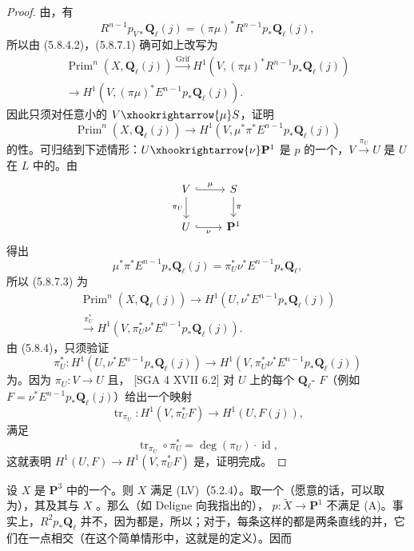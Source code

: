 \begin{proof}
由，有
\[R^{n-1}p_{V*}\mathbf Q_\ell(j)=(\pi\mu)^*R^{n-1}p_*\mathbf Q_\ell(j),\]
所以由 (5.8.4.2)，(5.8.7.1) 确可如上改写为
\[\begin{gathered}\operatorname{Prim}^n(X,\mathbf Q_\ell(j))\xrightarrow{\operatorname{Grif}}H^1(V,(\pi\mu)^*R^{n-1}p_*\mathbf Q_\ell(j))\\
\longrightarrow H^1(V,(\pi\mu)^*E^{n-1}p_*\mathbf Q_\ell(j)).\end{gathered}\]
因此只须对任意小的 $V\xhookrightarrow{\mu}S$，证明
\[\operatorname{Prim}^n(X,\mathbf Q_\ell(j))\longrightarrow H^1(V,\mu^*\pi^*E^{n-1}p_*\mathbf Q_\ell(j))\]
的性。可归结到下述情形：$U\xhookrightarrow{\nu}\mathbf P^1$ 是 $p$ 的一个，$V\xrightarrow{\pi_U}U$ 是 $U$ 在 $L$ 中的。由
\[
\begin{tikzcd}
V\arrow[r,hook,"\mu"]\arrow[d,"\pi_U"']&S\arrow[d,"\pi"]\\
U\arrow[r,hook,"\nu"']&\mathbf P^1
\end{tikzcd}
\]
得出
\[\mu^*\pi^*E^{n-1}p_*\mathbf Q_\ell(j)=\pi_U^*\nu^*E^{n-1}p_*\mathbf Q_\ell,\]
所以 (5.8.7.3) 为
\[\begin{gathered}\operatorname{Prim}^n(X,\mathbf Q_\ell(j))\longrightarrow H^1(U,\nu^*E^{n-1}p_*\mathbf Q_\ell(j))\\
\xrightarrow{\pi_U^*}H^1(V,\pi_U^*\nu^*E^{n-1}p_*\mathbf Q_\ell(j)).\end{gathered}\]
由 (5.8.4)，只须验证
\[\pi_U^*:H^1(U,\nu^*E^{n-1}p_*\mathbf Q_\ell(j))\longrightarrow H^1(V,\pi_U^*\nu^*E^{n-1}p_*\mathbf Q_\ell(j))\]
为。因为 $\pi_U:V\to U$ 且， [SGA 4 XVII 6.2] 对 $U$ 上的每个 $\mathbf Q_\ell$- $F$（例如 $F=\nu^*E^{n-1}p_*\mathbf Q_\ell(j)$）给出一个映射
\[\operatorname{tr}_{\pi_U}:H^1(V,\pi_U^*F)\longrightarrow H^1(U,F(j)),\]
满足
\[\operatorname{tr}_{\pi_U}\circ\pi_U^*=\deg(\pi_U)\cdot\operatorname{id},\]
这就表明 $H^1(U,F)\to H^1(V,\pi_U^*F)$ 是，证明完成。
\end{proof}
设 $X$ 是 $\mathbf P^3$ 中的一个。则 $X$ 满足 (LV)（5.2.4）。取一个（愿意的话，可以取为），其及其与 $X$ 。那么（如 Deligne 向我指出的）， $p:\widetilde X\to\mathbf P^1$ 不满足 (A)。事实上，$R^2p_*\mathbf Q_\ell$ 并不，因为都是，所以；对于，每条这样的都是两条直线的并，它们在一点相交（在这个简单情形中，这就是的定义）。因而
